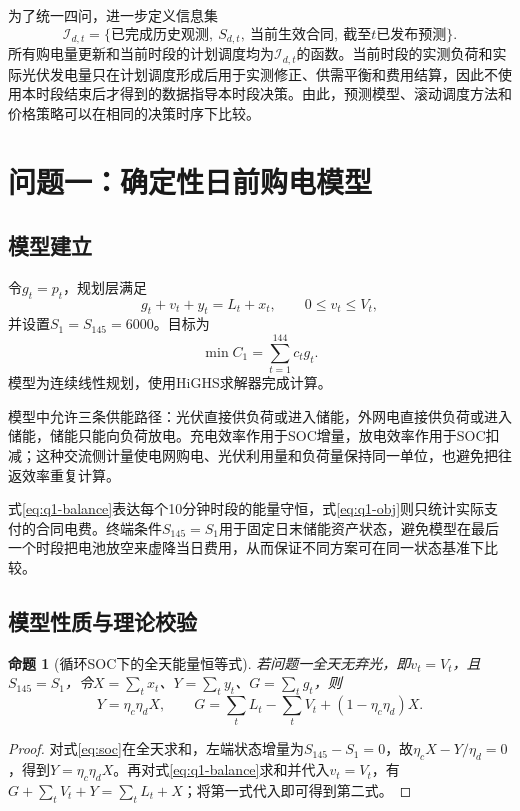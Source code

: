 \documentclass[UTF8,12pt,a4paper]{ctexart}
\newtheorem{proposition}{命题}[section]
\theoremstyle{remark}
\begin{document}
为了统一四问，进一步定义信息集
\begin{equation}
\mathcal I_{d,t}=\{\text{已完成历史观测},\ S_{d,t},\ \text{当前生效合同},\ \text{截至}t\text{已发布预测}\}.
\label{eq:info-set}
\end{equation}
所有购电量更新和当前时段的计划调度均为$\mathcal I_{d,t}$的函数。当前时段的实测负荷和实际光伏发电量只在计划调度形成后用于实测修正、供需平衡和费用结算，因此不使用本时段结束后才得到的数据指导本时段决策。由此，预测模型、滚动调度方法和价格策略可以在相同的决策时序下比较。

\section{问题一：确定性日前购电模型}
\subsection{模型建立}
令$g_t=p_t$，规划层满足
\begin{equation}g_t+v_t+y_t=L_t+x_t,\qquad0\le v_t\le V_t,\label{eq:q1-balance}\end{equation}
并设置$S_1=S_{145}=6000$。目标为
\begin{equation}\min C_1=\sum_{t=1}^{144}c_tg_t.\label{eq:q1-obj}\end{equation}
模型为连续线性规划，使用HiGHS求解器完成计算\cite{virtanen2020scipy}。

模型中允许三条供能路径：光伏直接供负荷或进入储能，外网电直接供负荷或进入储能，储能只能向负荷放电。充电效率作用于SOC增量，放电效率作用于SOC扣减；这种交流侧计量使电网购电、光伏利用量和负荷量保持同一单位，也避免把往返效率重复计算。

式\eqref{eq:q1-balance}表达每个10分钟时段的能量守恒，式\eqref{eq:q1-obj}则只统计实际支付的合同电费。终端条件$S_{145}=S_1$用于固定日末储能资产状态，避免模型在最后一个时段把电池放空来虚降当日费用，从而保证不同方案可在同一状态基准下比较。

\subsection{模型性质与理论校验}
\begin{proposition}[循环SOC下的全天能量恒等式]\label{prop:q1-energy}
若问题一全天无弃光，即$v_t=V_t$，且$S_{145}=S_1$，令$X=\sum_tx_t$、$Y=\sum_ty_t$、$G=\sum_tg_t$，则
\begin{equation}
Y=\eta_c\eta_dX,\qquad
G=\sum_tL_t-\sum_tV_t+(1-\eta_c\eta_d)X.
\label{eq:q1-identity}
\end{equation}
\end{proposition}
\begin{proof}
对式\eqref{eq:soc}在全天求和，左端状态增量为$S_{145}-S_1=0$，故$\eta_cX-Y/\eta_d=0$，得到$Y=\eta_c\eta_dX$。再对式\eqref{eq:q1-balance}求和并代入$v_t=V_t$，有$G+\sum_tV_t+Y=\sum_tL_t+X$；将第一式代入即可得到第二式。
\end{proof}
\end{document}
